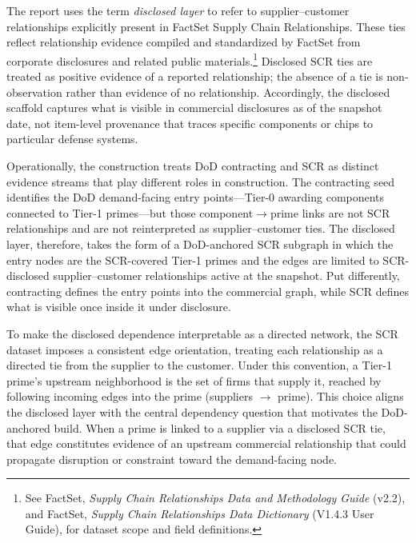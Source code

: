 The report uses the term \emph{disclosed layer} to refer to supplier--customer relationships explicitly present in FactSet Supply Chain Relationships. These ties reflect relationship evidence compiled and standardized by FactSet from corporate disclosures and related public materials.\footnote{See FactSet, \textit{Supply Chain Relationships Data and Methodology Guide} (v2.2), and FactSet, \textit{Supply Chain Relationships Data Dictionary} (V1.4.3 User Guide), for dataset scope and field definitions.} Disclosed SCR ties are treated as positive evidence of a reported relationship; the absence of a tie is non-observation rather than evidence of no relationship. Accordingly, the disclosed scaffold captures what is visible in commercial disclosures as of the snapshot date, not item-level provenance that traces specific components or chips to particular defense systems.

Operationally, the construction treats DoD contracting and SCR as distinct evidence streams that play different roles in construction. The contracting seed identifies the DoD demand-facing entry points---Tier-0 awarding components connected to Tier-1 primes---but those component$\rightarrow$prime links are not SCR relationships and are not reinterpreted as supplier--customer ties. The disclosed layer, therefore, takes the form of a DoD-anchored SCR subgraph in which the entry nodes are the \NumPrimes SCR-covered Tier-1 primes and the edges are limited to SCR-disclosed supplier--customer relationships active at the snapshot. Put differently, contracting defines the entry points into the commercial graph, while SCR defines what is visible once inside it under disclosure.

To make the disclosed dependence interpretable as a directed network, the SCR dataset imposes a consistent edge orientation, treating each relationship as a directed tie from the supplier to the customer. Under this convention, a Tier-1 prime's upstream neighborhood is the set of firms that supply it, reached by following incoming edges into the prime (suppliers $\rightarrow$ prime). This choice aligns the disclosed layer with the central dependency question that motivates the DoD-anchored build. When a prime is linked to a supplier via a disclosed SCR tie, that edge constitutes evidence of an upstream commercial relationship that could propagate disruption or constraint toward the demand-facing node.

